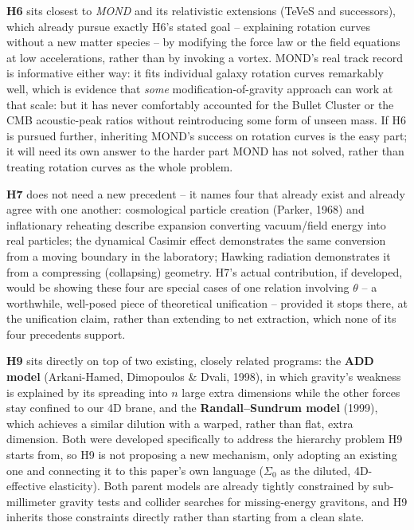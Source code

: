 \documentclass[12pt, a4paper]{article}
\begin{document}
\textbf{H6} sits closest to \emph{MOND} and its relativistic
extensions (TeVeS and successors), which already pursue exactly H6's
stated goal -- explaining rotation curves without a new matter
species -- by modifying the force law or the field equations at low
accelerations, rather than by invoking a vortex. MOND's real track
record is informative either way: it fits individual galaxy rotation
curves remarkably well, which is evidence that \emph{some}
modification-of-gravity approach can work at that scale: but it
has never comfortably accounted for the Bullet Cluster or the CMB
acoustic-peak ratios without reintroducing some form of unseen mass.
If H6 is pursued further, inheriting MOND's success on rotation
curves is the easy part; it will need its own answer to the harder
part MOND has not solved, rather than treating rotation curves as
the whole problem.

\textbf{H7} does not need a new precedent -- it names four that
already exist and already agree with one another: cosmological
particle creation (Parker, 1968) and inflationary reheating describe
expansion converting vacuum/field energy into real particles;
the dynamical Casimir effect demonstrates the same conversion from a
moving boundary in the laboratory; Hawking radiation demonstrates it
from a compressing (collapsing) geometry. H7's actual contribution,
if developed, would be showing these four are special cases of one
relation involving $\theta$ -- a worthwhile, well-posed piece of
theoretical unification -- provided it stops there, at the
unification claim, rather than extending to net extraction, which
none of its four precedents support.

\textbf{H9} sits directly on top of two existing, closely related
programs: the \textbf{ADD model} (Arkani-Hamed, Dimopoulos \& Dvali,
1998), in which gravity's weakness is explained by its spreading into
$n$ large extra dimensions while the other forces stay confined to
our 4D brane, and the \textbf{Randall--Sundrum model} (1999), which
achieves a similar dilution with a warped, rather than flat, extra
dimension. Both were developed specifically to address the hierarchy
problem H9 starts from, so H9 is not proposing a new mechanism, only
adopting an existing one and connecting it to this paper's own
language ($\Sigma_0$ as the diluted, 4D-effective elasticity). Both
parent models are already tightly constrained by sub-millimeter
gravity tests and collider searches for missing-energy gravitons,
and H9 inherits those constraints directly rather than starting from
a clean slate.
\end{document}
